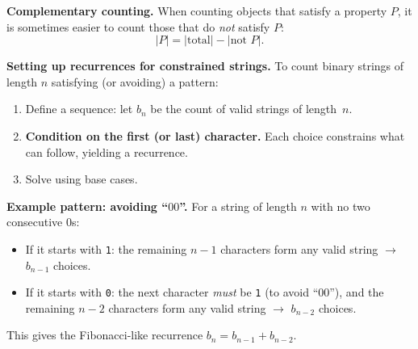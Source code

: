 \documentclass[12pt, a4paper]{article}
\begin{document}
\begin{theorybox}
\textbf{Complementary counting.}\;
When counting objects that satisfy a property $P$, it is sometimes easier
to count those that do \emph{not} satisfy $P$:
\[
  |P| = |\text{total}| - |\text{not } P|.
\]

\textbf{Setting up recurrences for constrained strings.}\;
To count binary strings of length $n$ satisfying (or avoiding) a pattern:
\begin{enumerate}[nosep]
  \item Define a sequence: let $b_n$ be the count of valid strings of length~$n$.
  \item \textbf{Condition on the first (or last) character.}\;
        Each choice constrains what can follow, yielding a recurrence.
  \item Solve using base cases.
\end{enumerate}

\medskip
\textbf{Example pattern: avoiding ``$00$''.}\;
For a string of length $n$ with no two consecutive $0$s:
\begin{itemize}[nosep]
  \item If it starts with \texttt{1}: the remaining $n-1$ characters form any valid
        string $\longrightarrow$ $b_{n-1}$ choices.
  \item If it starts with \texttt{0}: the next character \emph{must} be \texttt{1}
        (to avoid ``$00$''), and the remaining $n-2$ characters form any valid
        string $\longrightarrow$ $b_{n-2}$ choices.
\end{itemize}
This gives the Fibonacci-like recurrence $b_n = b_{n-1} + b_{n-2}$.

\begin{center}
\end{center}
\end{theorybox}
\end{document}
